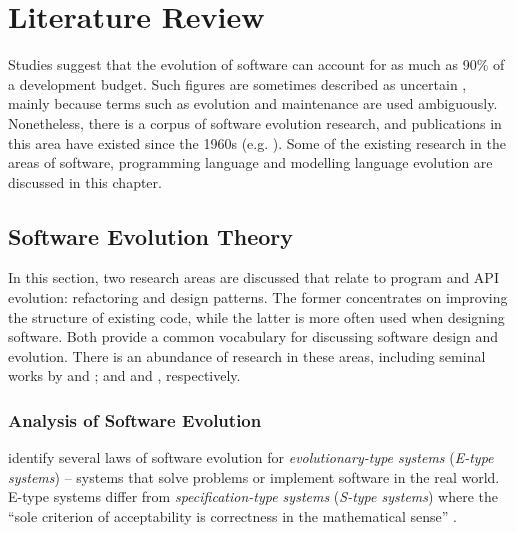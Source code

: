 
\chapter{Literature Review}
\label{LiteratureReview}


Studies \cite{erlikh00leveraging,moad90maintaining} suggest that the evolution of software can account for as much as 90\% of a development budget. Such figures are sometimes described as uncertain \cite[ch. 21]{sommerville06software}, mainly because terms such as evolution and maintenance are used ambiguously. Nonetheless, there is a corpus of software evolution research, and publications in this area have existed since the 1960s (e.g. \cite{lehman69programming}). Some of the existing research in the areas of software, programming language and modelling language evolution are discussed in this chapter.


\section{Software Evolution Theory}
In this section, two research areas are discussed that relate to program and API evolution: refactoring and design patterns. The former concentrates on improving the structure of existing code, while the latter is more often used when designing software. Both provide a common vocabulary for discussing software design and evolution. There is an abundance of research in these areas, including seminal works by \cite{opdyke92refactoring} and \cite{fowler99refactoring}; and \cite{alexander77pattern} and \cite{gamma95patterns}, respectively.


\subsection{Analysis of Software Evolution}
\cite{lehman80understanding,lehman78programs,lehman69programming} identify several laws of software evolution for \textit{evolutionary-type systems} (\textit{E-type systems}) -- systems that solve problems or implement software in the real world. E-type systems differ from \textit{specification-type systems} (\textit{S-type systems}) where the ``sole criterion of acceptability is correctness in the mathematical sense'' \cite{lehman85program}.

